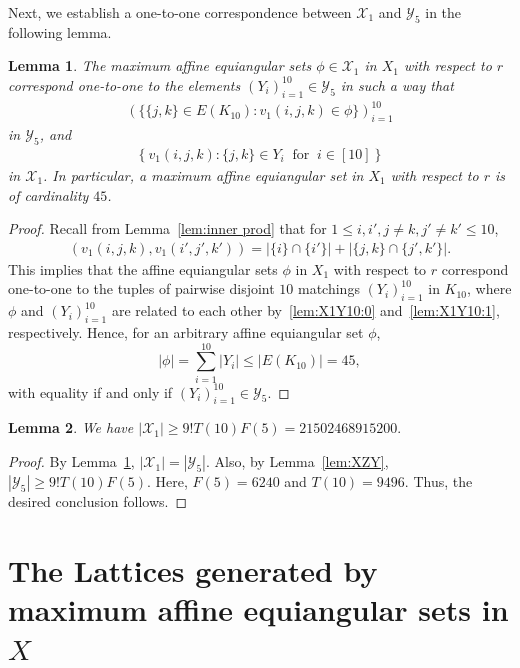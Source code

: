 \documentclass[reqno, 11pt]{amsart}
\numberwithin{equation}{section}
\newtheorem{lem}{Lemma}[section]
\theoremstyle{definition}
\newcommand{\cY}{\mathcal{Y}}
\newcommand{\aes}{\omega}
\newcommand{\aeso}{\phi}
\newcommand{\cX}{\mathcal{X}}
\newcommand{\sr}{ r } %
\begin{document}
Next, we establish a one-to-one correspondence between $\cX_1$ and $\cY_5$ in the following lemma.
\begin{lem}	\label{lem:X1Y10}
	The maximum affine equiangular sets $\aeso \in \cX_1$ in $X_1$ with respect to $\sr$ correspond one-to-one to the elements $(Y_i)_{i=1}^{10} \in \cY_{5}$ in such a way that
	\begin{align}	\label{lem:X1Y10:0}
		( \{ \{j,k\} \in E(K_{10}) : v_1(i,j,k) \in \aeso \} )_{i=1}^{10}  %
	\end{align}
	in $\cY_5$, and
	\begin{align}	\label{lem:X1Y10:1}
		\left\{ v_1(i,j,k) : \{j,k\} \in Y_i \ \text{ for }\ i \in [10] \right\}%
	\end{align}
	in $\cX_1$.
	In particular, a maximum affine equiangular set in $X_1$ with respect to $\sr$ is of cardinality $45$.
\end{lem}
\begin{proof}
	Recall from Lemma~\ref{lem:inner prod} that for \(1 \leq i, i', j \neq k, j' \neq k' \leq 10\),
	\begin{align*}
		(v_1(i, j, k), v_1(i', j', k')) = |\{i\} \cap \{i'\}| + |\{j, k\} \cap \{j', k'\}|.
	\end{align*}
	This implies that the affine equiangular sets $\aeso$ in \(X_1\) with respect to \(\sr\) correspond one-to-one to the tuples of pairwise disjoint \(10\) matchings \((Y_i)_{i=1}^{10}\) in \(K_{10}\),
	where \(\aeso\) and \((Y_i)_{i=1}^{10}\) are related to each other by~\eqref{lem:X1Y10:0} and~\eqref{lem:X1Y10:1}, respectively.
	Hence, for an arbitrary affine equiangular set $\aeso$,
	\[
		|\aeso| = \sum_{i=1}^{10} |Y_i| \leq |E(K_{10})| = 45,
	\]
	with equality if and only if $(Y_i)_{i=1}^{10} \in \cY_{5}$.
\end{proof}




\begin{lem}	\label{lem:num1}
	We have
	$|\cX_1| \geq 9!T(10)F(5) = 21502468915200.$
\end{lem}
\begin{proof}
	By Lemma~\ref{lem:X1Y10}, $|\cX_1| = |\cY_{5}|$.
	Also, by Lemma~\ref{lem:XZY}, $|\cY_5| \geq 9! T(10) F(5)$.
	Here, $F(5) = 6240$ and $T(10) = 9496$.
	Thus, the desired conclusion follows.
\end{proof}

\section{The Lattices generated by maximum affine equiangular sets in $X$}	\label{sec:gen}
\end{document}
